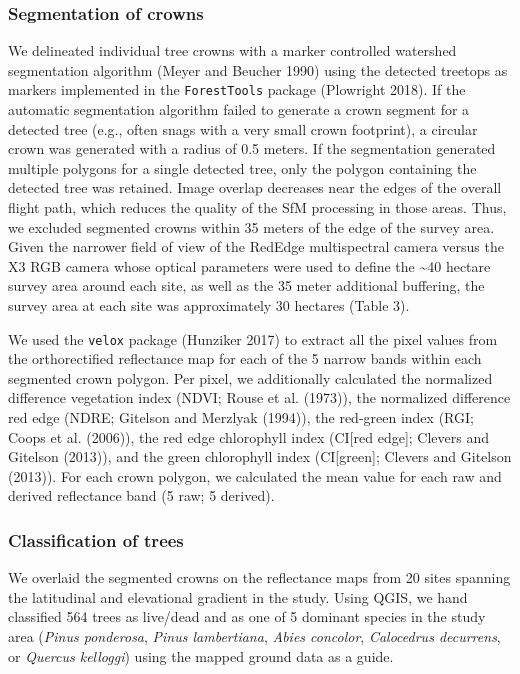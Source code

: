 \documentclass[]{article}
\begin{document}
\subsubsection{Segmentation of crowns}\label{segmentation-of-crowns}

We delineated individual tree crowns with a marker controlled watershed
segmentation algorithm (Meyer and Beucher 1990) using the detected
treetops as markers implemented in the \texttt{ForestTools} package
(Plowright 2018). If the automatic segmentation algorithm failed to
generate a crown segment for a detected tree (e.g., often snags with a
very small crown footprint), a circular crown was generated with a
radius of 0.5 meters. If the segmentation generated multiple polygons
for a single detected tree, only the polygon containing the detected
tree was retained. Image overlap decreases near the edges of the overall
flight path, which reduces the quality of the SfM processing in those
areas. Thus, we excluded segmented crowns within 35 meters of the edge
of the survey area. Given the narrower field of view of the RedEdge
multispectral camera versus the X3 RGB camera whose optical parameters
were used to define the \textasciitilde{}40 hectare survey area around
each site, as well as the 35 meter additional buffering, the survey area
at each site was approximately 30 hectares (Table 3).

We used the \texttt{velox} package (Hunziker 2017) to extract all the
pixel values from the orthorectified reflectance map for each of the 5
narrow bands within each segmented crown polygon. Per pixel, we
additionally calculated the normalized difference vegetation index
(NDVI; Rouse et al. (1973)), the normalized difference red edge (NDRE;
Gitelson and Merzlyak (1994)), the red-green index (RGI; Coops et al.
(2006)), the red edge chlorophyll index (CI{[}red edge{]}; Clevers and
Gitelson (2013)), and the green chlorophyll index (CI{[}green{]};
Clevers and Gitelson (2013)). For each crown polygon, we calculated the
mean value for each raw and derived reflectance band (5 raw; 5 derived).

\subsubsection{Classification of trees}\label{classification-of-trees}

We overlaid the segmented crowns on the reflectance maps from 20 sites
spanning the latitudinal and elevational gradient in the study. Using
QGIS, we hand classified 564 trees as live/dead and as one of 5 dominant
species in the study area (\emph{Pinus ponderosa}, \emph{Pinus
lambertiana}, \emph{Abies concolor}, \emph{Calocedrus decurrens}, or
\emph{Quercus kelloggi}) using the mapped ground data as a guide.
\end{document}
